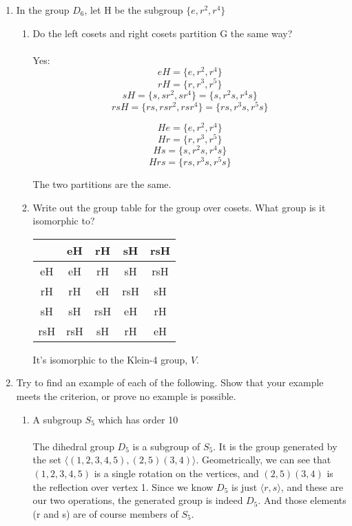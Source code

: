 \begin{enumerate}
      \item In the group $D_6$, let H be the subgroup $\{e, r^2, r^4\}$
            \begin{enumerate}
            \item Do the left cosets and right cosets partition G the same way?\\\\

            Yes:
            $$eH = \{e, r^2, r^4\}$$
            $$rH = \{r, r^3, r^5\}$$
            $$sH = \{s, sr^2, sr^4\} = \{s, r^2s, r^4s\}$$
            $$rsH = \{rs, rsr^2, rsr^4\} = \{rs, r^3s, r^5s\}$$

            $$He = \{e, r^2, r^4\}$$
            $$Hr = \{r, r^3, r^5\}$$
            $$Hs = \{s, r^2s, r^4s\}$$
            $$Hrs = \{rs, r^3s, r^5s\}$$

            The two partitions are the same.\\

            \item Write out the group table for the group over cosets. What group is it isomorphic to?
            \begin{center}
            \begin{tabular}{c|c|c|c|c|}
             & eH & rH & sH & rsH\\
             \hline
             eH & eH & rH & sH & rsH\\
             rH & rH & eH & rsH & sH\\
             sH & sH & rsH & eH & rH\\
             rsH & rsH & sH & rH & eH\\
            \end{tabular}
          \end{center}

          It's isomorphic to the Klein-4 group, $V$.
          \end{enumerate}

      \item Try to find an example of each of the following. Show that your example meets the criterion, or prove no example is possible.
            \begin{enumerate}
            \item A subgroup $S_5$ which has order 10\\\\

            The dihedral group $D_5$ is a subgroup of $S_5$. It is the group generated by the set $\langle (1,2,3,4,5) , (2,5)(3,4) \rangle$. Geometrically, we can see that $(1,2,3,4,5)$ is a single rotation on the vertices, and $(2,5)(3,4)$ is the reflection over vertex 1. Since we know $D_5$ is just $\langle r , s \rangle$, and these are our two operations, the generated group is indeed $D_5$. And those elements (r and s) are of course members of $S_5$.\\


\end{enumerate}
\end{enumerate}
